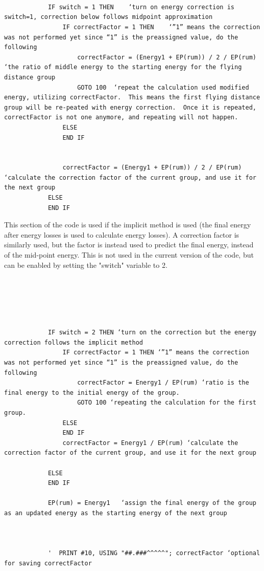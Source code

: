 \documentclass[10pt, reqno]{exam}
\begin{document}
\begin{verbatim}

    
    
            IF switch = 1 THEN    ‘turn on energy correction is switch=1, correction below follows midpoint approximation
                IF correctFactor = 1 THEN    ‘”1” means the correction was not performed yet since “1” is the preassigned value, do the following
                    correctFactor = (Energy1 + EP(rum)) / 2 / EP(rum)  ‘the ratio of middle energy to the starting energy for the flying distance group
                    GOTO 100  ‘repeat the calculation used modified energy, utilizing correctFactor.  This means the first flying distance group will be re-peated with energy correction.  Once it is repeated,  correctFactor is not one anymore, and repeating will not happen. 
                ELSE
                END IF
    
    
                correctFactor = (Energy1 + EP(rum)) / 2 / EP(rum)   ‘calculate the correction factor of the current group, and use it for the next group
            ELSE
            END IF
\end{verbatim}

This section of the code is used if the implicit method is used (the final energy after energy losses is used to calculate energy losses). A correction factor is similarly used, but the factor is instead used to predict the final energy, instead of the mid-point energy. This is not used in the current version of the code, but can be enabled by setting the "switch" variable to 2. \par

\begin{verbatim}

    
            
    
    
            IF switch = 2 THEN ‘turn on the correction but the energy correction follows the implicit method
                IF correctFactor = 1 THEN ‘”1” means the correction was not performed yet since “1” is the preassigned value, do the following
                    correctFactor = Energy1 / EP(rum) ‘ratio is the final energy to the initial energy of the group. 
                    GOTO 100 ‘repeating the calculation for the first group. 
                ELSE
                END IF
                correctFactor = Energy1 / EP(rum) ‘calculate the correction factor of the current group, and use it for the next group
    
            ELSE
            END IF
    
            EP(rum) = Energy1   ‘assign the final energy of the group as an updated energy as the starting energy of the next group 
    
    
    
            '  PRINT #10, USING "##.###^^^^^"; correctFactor ‘optional for saving correctFactor
\end{verbatim}
\end{document}
